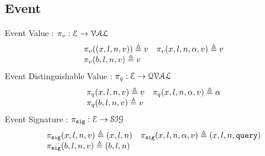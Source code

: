 %
%
\subsection{Event}
%
Event Value : $\pi_v : \mathcal{E} \to \mathcal{VAL}$
\[
\begin{array}{ll}
\pi_v((x, l, n, v)) \triangleq v
&
\pi_v (x, l, n, \alpha, v) \triangleq v
\\
\pi_v (b, l, n, v)  \triangleq v
&
\end{array}
\]
%
%
Event Distinguishable Value : $\pi_{q} : \mathcal{E} \to \mathcal{QVAL}$ 
\[
\begin{array}{ll}
\pi_{q} (x, l, n, v) \triangleq v
&
\pi_{q} (x, l, n, \alpha, v) \triangleq \alpha
\\
\pi_{q} (b, l, n, v)  \triangleq v
&
\end{array}
\]%
% 
Event Signature : $\pi_{\mathtt{sig}} : \mathcal{E} \to \mathcal{SIG}$
\[
\begin{array}{ll}
\pi_{\mathtt{sig}} (x, l, n, v) \triangleq (x, l, n)
&
\pi_{\mathtt{sig}} (x, l, n, \alpha, v) \triangleq (x, l, n, {\tt query})
\\
\pi_{\mathtt{sig}} (b, l, n, v)  \triangleq (b, l, n)
&
\end{array}
\]


